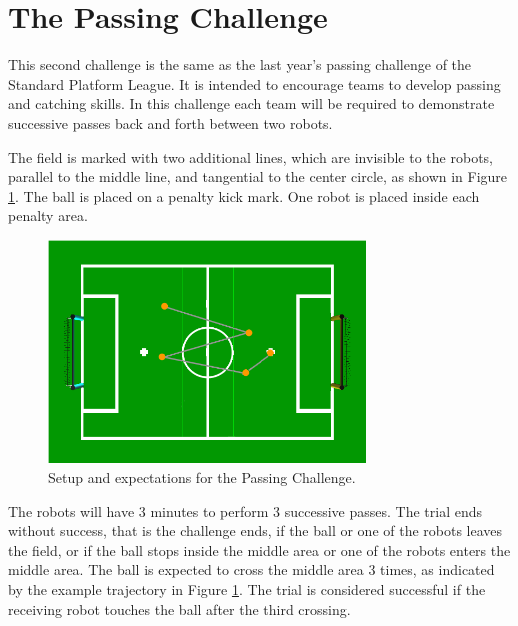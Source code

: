 \documentclass{article}
\begin{document}
\section{The Passing Challenge}
\label{sec:passing}

This second challenge is the same as the last year's passing challenge of the 
Standard Platform League. It is intended to encourage teams to develop passing 
and catching skills. In this challenge each team will be required to demonstrate 
successive passes back and forth between two robots.

The field is marked with two additional lines, which are invisible to the 
robots, parallel to the middle line, and tangential to the center circle, 
as shown in Figure \ref{fig:passingchallenge}. The ball is placed on a 
penalty kick mark. One robot is placed inside each penalty area.

\begin{figure}[htbp]
 \centering
 \includegraphics[width=0.75\textwidth]{figures/nao_passingchallenge.png}
 \caption{Setup and expectations for the Passing Challenge.}
 \label{fig:passingchallenge}
\end{figure}

The robots will have 3 minutes to perform 3 successive passes. The trial ends 
without success, that is the challenge ends, if the ball or one of the robots 
leaves the field, or if the ball stops inside the middle area or one of the 
robots enters the middle area. The ball is expected to cross the middle area 
3 times, as indicated by the example trajectory in Figure \ref{fig:passingchallenge}. 
The trial is considered successful if the receiving robot touches the ball after 
the third crossing.
\end{document}
